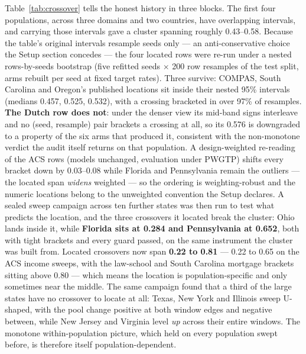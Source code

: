 \documentclass[9pt,conference]{IEEEtran}
\begin{document}
Table~\ref{tab:crossover} tells the honest history in three blocks. The first four
populations, across three domains and two countries, have overlapping intervals, and
carrying those intervals gave a cluster spanning roughly 0.43--0.58. Because the
table's original intervals resample seeds only --- an anti-conservative choice the
Setup section concedes --- the four located rows were re-run under a nested
rows-by-seeds bootstrap (five refitted seeds $\times$ 200 row resamples of the test
split, arms rebuilt per seed at fixed target rates). Three survive: COMPAS, South
Carolina and Oregon's published locations sit inside their nested 95\% intervals
(medians 0.457, 0.525, 0.532), with a crossing bracketed in over 97\% of resamples.
\textbf{The Dutch row does not}: under the denser view its mid-band signs interleave
and no (seed, resample) pair brackets a crossing at all, so its 0.576 is downgraded to
a property of the six arms that produced it, consistent with the non-monotone verdict
the audit itself returns on that population. A design-weighted re-reading of the ACS
rows (models unchanged, evaluation under PWGTP) shifts every bracket down by
0.03--0.08 while Florida and Pennsylvania remain the outliers --- the located span
\emph{widens} weighted --- so the ordering is weighting-robust and the numeric
locations belong to the unweighted convention the Setup declares. A sealed sweep campaign
across ten further states was then run to test what predicts the location, and the three
crossovers it located break the cluster: Ohio lands inside it, while \textbf{Florida sits at
0.284 and Pennsylvania at 0.652}, both with tight brackets and every guard passed, on the
same instrument the cluster was built from. Located crossovers now span \textbf{0.22 to 0.81} --- 0.22 to 0.65 on the ACS income sweeps, with the law-school and South Carolina mortgage brackets sitting above 0.80 --- which means the location is population-specific and only sometimes near the middle. The same campaign found that a third of the large states have no crossover to
locate at all: Texas, New York and Illinois sweep U-shaped, with the pool change positive
at both window edges and negative between, while New Jersey and Virginia level \emph{up}
across their entire windows. The monotone within-population picture, which held on every
population swept before, is therefore itself population-dependent.
\end{document}
